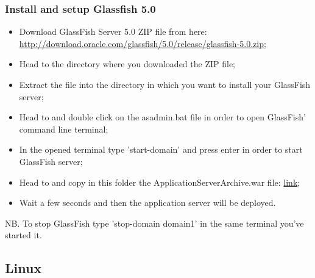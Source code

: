 \subsubsection{Install and setup Glassfish 5.0}
\begin{itemize}
	\item Download GlassFish Server 5.0 ZIP file from here: \\ \href{http://download.oracle.com/glassfish/5.0/release/glassfish-5.0.zip}{\color{blue}http://download.oracle.com/glassfish/5.0/release/glassfish-5.0.zip};
	\item Head to the directory where you downloaded the ZIP file;
	\item Extract the file into the directory in which you want to install your GlassFish server;
	\item Head to  and double click on the asadmin.bat file in order to open GlassFish' command line terminal;
	\item In the opened terminal type 'start-domain' and press enter in order to start GlassFish server;
	\item Head to  and copy in this folder the ApplicationServerArchive.war file: \href{https://github.com/JustSalva/MelziPinaSalvadore/tree/master/DeliveryFolder/InstallationFolder}{\color{blue}link};
	\item Wait a few seconds and then the application server will be deployed.
\end{itemize} 
NB. To stop GlassFish type 'stop-domain domain1' in the same terminal you've started it.
	
\subsection{Linux}
\label{subsect:Linux}

